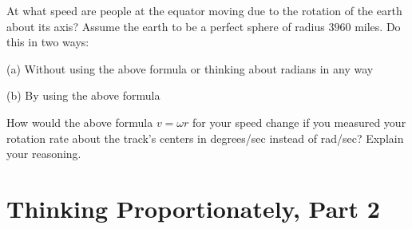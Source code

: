 \documentclass{ximera}
\begin{document}
\begin{question}  \label{Q255: Angles}
At what speed are people at the equator moving due to the rotation of the earth about its axis? Assume the earth to be a perfect sphere of radius $3960$ miles. Do this in two ways:

(a) Without using the above formula or thinking about radians in any way

(b) By using the above formula

\end{question}



\begin{question}  \label{Q2455: Angles}
How would the above formula $v=\omega r$ for your speed change if you measured your rotation rate about the track's centers in degrees/sec instead of rad/sec? Explain your reasoning.

\end{question}



\section{Thinking Proportionately, Part 2}
\end{document}
